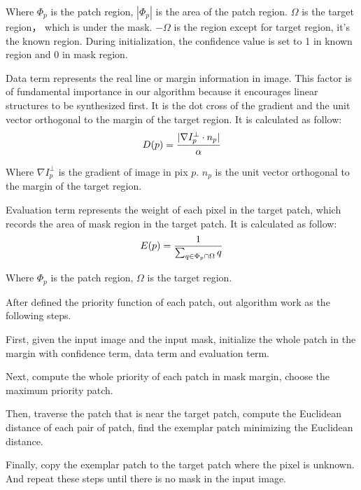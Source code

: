 Where $\Phi_p$ is the patch region, $|\Phi_p|$ is the area of the patch region. $\Omega$ is the target region， which is under the mask. $-\Omega$ is the region except for target region, it's the known region. During initialization, the confidence value is set to 1 in known region and 0 in mask region. 

Data term represents the real line or margin information in image. This factor is of
fundamental importance in our algorithm because it encourages linear structures to be synthesized first. It is the dot cross of the gradient and the unit vector orthogonal to the margin of the target region. It is calculated as follow:
\begin{equation*}
\centering
D(p)=\frac{|\nabla I^\bot_p \cdot n_p|}{\alpha}
\nonumber
\end{equation*}

Where $\nabla I^\bot_p$ is the gradient of image in pix $p$. $n_p$ is the unit vector orthogonal to the margin of the target region.

Evaluation term represents the weight of each pixel in the target patch, which records the area of mask region in the target patch. It is calculated as follow:
\begin{equation*}
\centering
E(p)=\frac{1}{\sum_{q \in \Phi_p \cap \Omega}q}
\nonumber
\end{equation*}

Where $\Phi_p$ is the patch region, $\Omega$ is the target region.

After defined the priority function of each patch, out algorithm work as the following steps.

First, given the input image and the input mask, initialize the whole patch in the margin with confidence term, data term and evaluation term. 

Next, compute the whole priority of each patch in mask margin, choose the maximum priority patch.

Then, traverse the patch that is near the target patch, compute the Euclidean distance of each pair of patch, find the exemplar patch minimizing the Euclidean distance.

Finally, copy the exemplar patch to the target patch where the pixel is unknown. And repeat these steps until there is no mask in the input image.